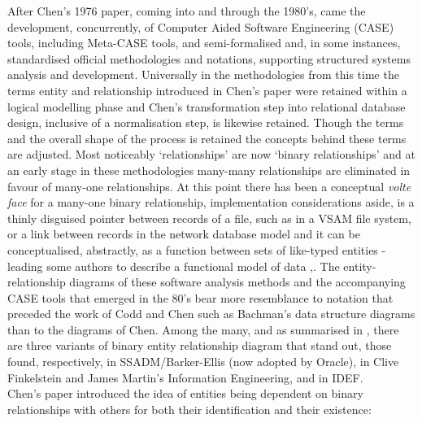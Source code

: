 \documentclass[10pt,a4paper]{article}
\begin{document}

\noindent After Chen's 1976 paper, coming into and through the 1980's, came the development, concurrently, of Computer Aided Software Engineering (CASE) tools, including Meta-CASE tools, and semi-formalised and, in some instances, standardised official methodologies and notations, supporting structured systems analysis and development. Universally in the methodologies from this time the terms entity and relationship introduced in Chen's paper  were retained within a logical modelling phase and Chen's transformation step into relational database design,
inclusive of a normalisation step, is likewise retained. Though the terms and the overall shape of the process is retained the concepts behind these terms are adjusted. Most noticeably `relationships' are now `binary relationships' and at an early stage in these methodologies many-many relationships are eliminated in favour of many-one relationships. At this point there has been a conceptual \textit{volte face} for a many-one  binary relationship, implementation considerations aside, is a thinly disguised pointer between records of a file, such as in a VSAM file system,  or a link between records in the network database model and it can be conceptualised, abstractly, as a function between sets of like-typed entities - leading some authors to describe a 
functional model of data \cite{Buneman1979},\cite{Shipman1981}. The entity-relationship diagrams of these software analysis  methods and the accompanying CASE tools
that emerged in the 80's bear more resemblance to notation that preceded the work of Codd and Chen such as Bachman's data structure diagrams than to the diagrams of Chen.  
Among the many, and as summarised in  \cite{Rock-Evans1989},  there are three variants of binary entity relationship diagram that stand out, those found, respectively,  in SSADM/Barker-Ellis (now adopted by Oracle), in Clive Finkelstein and James Martin's Information Engineering,  and in IDEF. \\



\noindent 
Chen's paper introduced the idea of entities being dependent on binary relationships 
with others for both their identification and their existence:
\end{document}
